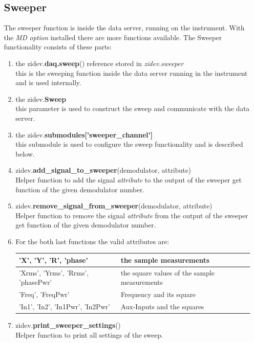 \documentclass[11pt]{article} %
\begin{document}
\subsection{Sweeper}
The sweeper function is inside the data server, running on the instrument. With the {\it MD option} installed there are more functions available. The Sweeper functionality consists of these parts:
\begin{enumerate}
\item the zidev.{\bf daq.sweep}() reference stored in {\it zidev.sweeper} \\
	this is the sweeping function inside the data server running in the instrument and is used internally.
\item the zidev.{\bf Sweep} \\
	this parameter is used to construct the sweep and communicate with the data server.
\item the zidev.{\bf submodules['sweeper\_channel']} \\
	this submodule is used to configure the sweep functionality and is described below.

\item zidev.{\bf add\_signal\_to\_sweeper}(demodulator, attribute) \\
	Helper function to add the signal {\it attribute} to the output of the sweeper get function of the given demodulator number.
\item zidev.{\bf remove\_signal\_from\_sweeper}(demodulator, attribute) \\
	Helper function to remove the signal {\it attribute} from the output of the sweeper get function of the given demodulator number.
\item[] For the both last functions the valid attributes are: \\[-0.5em]
	\setlength{\LTleft}{1.5cm}
	\begin{longtable}{|p{6cm}|p{8.5cm}|}
	\hline
	'X', 'Y', 'R', 'phase' & the sample measurements \\ \hline
	'Xrms', 'Yrms', 'Rrms', 'phasePwr' & the square values of the sample measurements \\ \hline
	'Freq', 'FreqPwr' & Frequency and its square \\ \hline
	'In1', 'In2', 'In1Pwr', 'In2Pwr' & Aux-Inputs and the squares \\ \hline
	\end{longtable}

\item zidev.{\bf print\_sweeper\_settings}() \\
	Helper function to print all settings of the sweep.

\end{enumerate}
\end{document}
